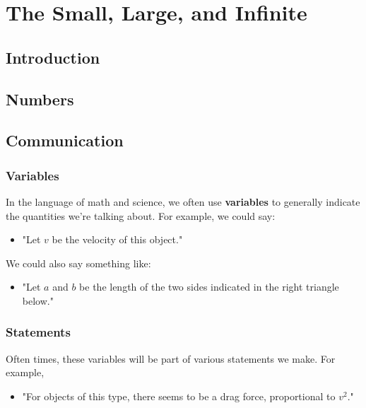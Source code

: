 
\chapter{The Small, Large, and Infinite}

\section{Introduction}



\section{Numbers}


\section{Communication}

\subsection{Variables}

In the language of math and science, we often use \textbf{variables} to generally indicate the quantities we're talking about. For example, we could say:

\begin{itemize}
\item "Let $v$ be the velocity of this object." %
\end{itemize}

We could also say something like:

\begin{itemize}
\item "Let $a$ and $b$ be the length of the two sides indicated in the right triangle below."
\end{itemize}



\subsection{Statements}

Often times, these variables will be part of various statements we make. For example, 
\begin{itemize}
\item "For objects of this type, there seems to be a drag force, proportional to $v^2$." 
\end{itemize}

